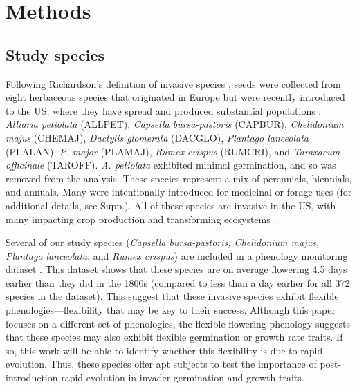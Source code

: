\documentclass[12pt]{article}\usepackage[]{graphicx}\usepackage[]{color}
\begin{document}
	\section{Methods}
	\subsection{Study species}
	Following Richardson's definition of invasive species \parencite[][, see Supp. for details]{Richardson2000, Richardson2011}, seeds were collected from eight herbaceous species that originated in Europe but were recently introduced to the US, where they have spread and produced substantial populations \parencite{Uva1997}:\textit{ Alliaria petiolata} (ALLPET), \textit{Capsella bursa-pastoris} (CAPBUR), \textit{Chelidonium majus} (CHEMAJ), \textit{Dactylis glomerata} (DACGLO),  \textit{Plantago lanceolata} (PLALAN), \textit{P.  major} (PLAMAJ), \textit{Rumex crispus} (RUMCRI), and \textit{Taraxacum officinale} (TAROFF). \textit{A. petiolata} exhibited minimal germination, and so was removed from the analysis. These species represent a mix of perennials, biennials, and annuals. Many were intentionally introduced for medicinal or forage uses (for additional details, see Supp.).  All of these species are invasive in the US, with many impacting crop production and transforming ecosystems \parencite[e.g.,][]{Froese2003,Wolfe2008}. 

Several of our study species (\textit{Capsella bursa-pastoris, Chelidonium majus, Plantago lanceolata}, and \textit{Rumex crispus}) are included in a phenology monitoring dataset \parencite[the Concord Phenology Dataset,][]{Willis:2008bf}. This dataset shows that these species  are on average flowering 4.5 days earlier than they did in the 1800s (compared to less than a day earlier for all 372 species in the dataset). This suggest that these invasive species exhibit flexible phenologies---flexibility that may be key to their success. Although this paper focuses on a different set of phenologies, the flexible flowering phenology suggests that these species may also exhibit flexible germination or growth rate traits. If so, this work will be able to identify whether this flexibility is due to rapid evolution. Thus, these species offer apt subjects to test the importance of post-introduction rapid evolution in invader germination and growth traits. 
\end{document}
